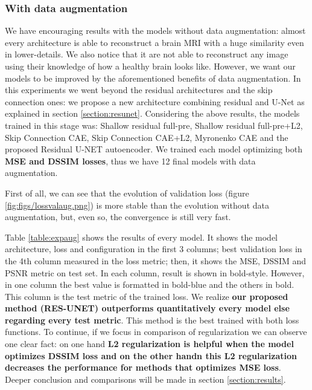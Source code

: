 \FloatBarrier

\subsubsection{With data augmentation}

We have encouraging results with the models without data augmentation: almost every architecture is able to reconstruct a brain MRI with a huge similarity even in lower-details. We also notice that it are not able to reconstruct any image using their knowledge of how a healthy brain looks like. However, we want our models to be improved by the aforementioned benefits of data augmentation. In this experiments we went beyond the residual architectures and the skip connection ones: we propose a new architecture combining residual and U-Net as explained in section \ref{section:resunet}. Considering the above results, the models trained in this stage was: Shallow residual full-pre, Shallow residual full-pre+L2, Skip Connection CAE, Skip Connection CAE+L2, Myronenko CAE and the proposed Residual U-NET autoencoder. We trained each model optimizing both \textbf{MSE and DSSIM losses}, thus we have 12 final models with data augmentation.

First of all, we can see that the evolution of validation loss (figure \ref{fig:figs/lossvalaug.png}) is more stable than the evolution without data augmentation, but, even so, the convergence is still very fast. 


Table \ref{table:expaug} shows the results of every model. It shows the model architecture, loss and configuration in the first 3 columns; best validation loss in the 4th column measured in the loss metric; then, it shows the MSE, DSSIM and PSNR metric on test set. In each column, result is shown in bold-style. However, in one column the best value is formatted in bold-blue and the others in bold. This column is the test metric of the trained loss. We realize \textbf{our proposed method (RES-UNET) outperforms quantitatively every model else regarding every test metric}. This method is the best trained with both loss functions. To continue, if we focus in comparison of regularization we can observe one clear fact: on one hand \textbf{L2 regularization is helpful when the model optimizes DSSIM loss and on the other handn this L2 regularization decreases the performance for methods that optimizes MSE loss}. Deeper conclusion and comparisons will be made in section \ref{section:results}.



